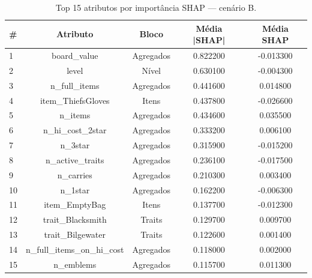 \begin{table}[htbp]
\caption{Top 15 atributos por importância SHAP — cenário B.}
\label{tab:topB}
\centering
\small
\begin{tabular}{lcccc}
\toprule
\# & Atributo & Bloco & Média |SHAP| & Média SHAP \\
\midrule
1 & board\_value & Agregados & 0.822200 & -0.013300 \\
2 & level & Nível & 0.630100 & -0.004300 \\
3 & n\_full\_items & Agregados & 0.441600 & 0.014800 \\
4 & item\_ThiefsGloves & Itens & 0.437800 & -0.026600 \\
5 & n\_items & Agregados & 0.434600 & 0.035500 \\
6 & n\_hi\_cost\_2star & Agregados & 0.333200 & 0.006100 \\
7 & n\_3star & Agregados & 0.315900 & -0.015200 \\
8 & n\_active\_traits & Agregados & 0.236100 & -0.017500 \\
9 & n\_carries & Agregados & 0.210300 & 0.003400 \\
10 & n\_1star & Agregados & 0.162200 & -0.006300 \\
11 & item\_EmptyBag & Itens & 0.137700 & -0.012300 \\
12 & trait\_Blacksmith & Traits & 0.129700 & 0.009700 \\
13 & trait\_Bilgewater & Traits & 0.122600 & 0.001400 \\
14 & n\_full\_items\_on\_hi\_cost & Agregados & 0.118000 & 0.002000 \\
15 & n\_emblems & Agregados & 0.115700 & 0.011300 \\
\bottomrule
\end{tabular}
\end{table}

